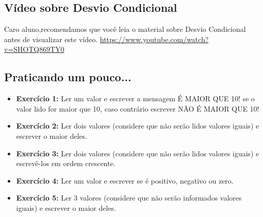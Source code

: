 \documentclass{article}
\begin{document}
\subsection{Vídeo sobre Desvio Condicional}
Caro aluno,recomendamos que você leia o material sobre Desvio Condicional antes de visualizar este vídeo.
\href{https://www.youtube.com/watch?v=SHOTQ869TY0}{https://www.youtube.com/watch?v=SHOTQ869TY0}

\subsection{Praticando um pouco...}
\begin{itemize}
    \item \textbf{Exercício 1:} Ler um valor e escrever a mensagem É MAIOR QUE 10! se o valor lido for maior que 10, caso contrário escrever NÃO É MAIOR QUE 10!
    \item \textbf{Exercício 2:} Ler dois valores (considere que não serão lidos valores iguais) e escrever o maior deles.
    \item \textbf{Exercício 3:} Ler dois valores (considere que não serão lidos valores iguais) e escrevê-los em ordem crescente.
    \item \textbf{Exercício 4:} Ler um valor e escrever se é positivo, negativo ou zero.
    \item \textbf{Exercício 5:} Ler 3 valores (considere que não serão informados valores iguais) e escrever o maior deles.
\end{itemize}
\end{document}
